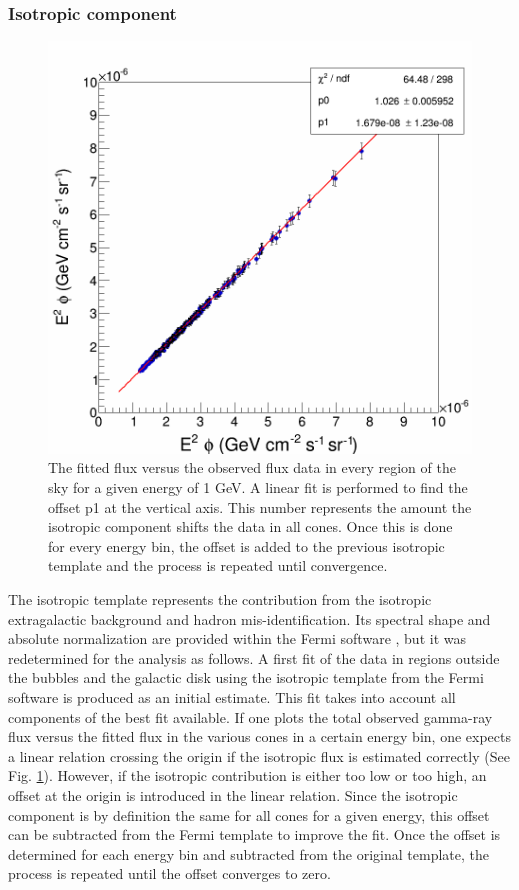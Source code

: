 \subsubsection{Isotropic component}

\begin{figure}
 \centering
 \includegraphics[width=.5\linewidth]{pic/method/iso_calibration.png}
 \caption{The fitted flux versus the observed flux data in every region of the sky for a given energy of 1 GeV. A linear fit is performed to find the offset p1 at the vertical axis. This number represents the amount the isotropic component shifts the data in all cones. Once this is done for every energy bin, the offset is added to the previous isotropic template and the process is repeated until convergence. }
 \label{fig:iso_calibration}
\end{figure}


The isotropic template represents the contribution from the isotropic extragalactic background and hadron mis-identification. Its spectral shape and absolute normalization are provided within the Fermi software \cite{FermiTools}, but it was redetermined for the analysis as follows.
A first fit of the data in regions outside the bubbles and the galactic disk using the isotropic template from the Fermi software is produced as an initial estimate. This fit takes into account all components of the best fit available.
If one plots the total observed gamma-ray flux versus the fitted flux in the various cones in a certain energy bin, one expects a linear relation crossing the origin if the isotropic flux is estimated correctly (See Fig. \ref{fig:iso_calibration}). However, if the isotropic contribution is either too low or too high, an offset at the origin is introduced in the linear relation. Since the isotropic component is by definition the same for all cones for a given energy, this offset can be subtracted from the Fermi template to improve the fit. 
Once the offset is determined for each energy bin and subtracted from the original template, the process is repeated until the offset converges to zero.

